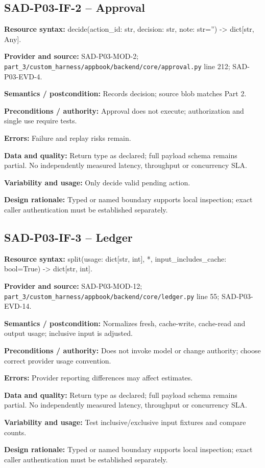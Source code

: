 \documentclass[10pt,letterpaper]{article}
\begin{document}
\subsection{SAD-P03-IF-2 -- Approval}
{\raggedright \textbf{Resource syntax:} decide(\allowbreak{}action\_\allowbreak{}id: str, decision: str, note: str='') -> dict[str, Any].\par}
\textbf{Provider and source:} SAD-P03-MOD-2; \nolinkurl{part_3/custom_harness/appbook/backend/core/approval.py} line 212; SAD-P03-EVD-4.\par
\textbf{Semantics / postcondition:} Records decision; source blob matches Part 2.\par
\textbf{Preconditions / authority:} Approval does not execute; authorization and single use require tests.\par
\textbf{Errors:} Failure and replay risks remain.\par
\textbf{Data and quality:} Return type as declared; full payload schema remains partial. No independently measured latency, throughput or concurrency SLA.\par
\textbf{Variability and usage:} Only decide valid pending action.\par
\textbf{Design rationale:} Typed or named boundary supports local inspection; exact caller authentication must be established separately.\par

\subsection{SAD-P03-IF-3 -- Ledger}
{\raggedright \textbf{Resource syntax:} split(\allowbreak{}usage: dict[str, int], *, input\_\allowbreak{}includes\_\allowbreak{}cache: bool=True) -> dict[str, int].\par}
\textbf{Provider and source:} SAD-P03-MOD-12; \nolinkurl{part_3/custom_harness/appbook/backend/core/ledger.py} line 55; SAD-P03-EVD-14.\par
\textbf{Semantics / postcondition:} Normalizes fresh, cache-write, cache-read and output usage; inclusive input is adjusted.\par
\textbf{Preconditions / authority:} Does not invoke model or change authority; choose correct provider usage convention.\par
\textbf{Errors:} Provider reporting differences may affect estimates.\par
\textbf{Data and quality:} Return type as declared; full payload schema remains partial. No independently measured latency, throughput or concurrency SLA.\par
\textbf{Variability and usage:} Test inclusive/exclusive input fixtures and compare counts.\par
\textbf{Design rationale:} Typed or named boundary supports local inspection; exact caller authentication must be established separately.\par
\end{document}
